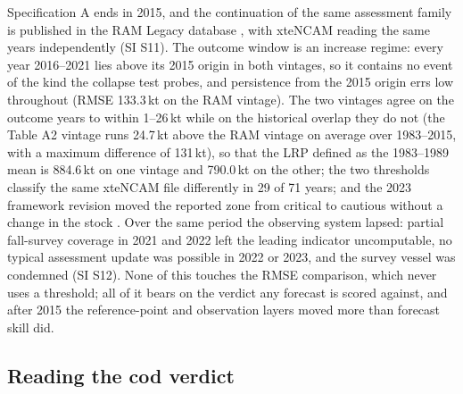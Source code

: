 \documentclass[preprint,11pt,authoryear]{elsarticle}
\theoremstyle{definition}
\theoremstyle{remark}
\begin{document}
Specification A ends in 2015, and the continuation of the same assessment family is published in the RAM Legacy database \citep[v4.66, stock COD2J3KL;][]{Ricard2012}, with xteNCAM reading the same years independently (SI S11). The outcome window is an increase regime: every year 2016--2021 lies above its 2015 origin in both vintages, so it contains no event of the kind the collapse test probes, and persistence from the 2015 origin errs low throughout (RMSE 133.3\,kt on the RAM vintage). The two vintages agree on the outcome years to within 1--26\,kt while on the historical overlap they do not (the Table A2 vintage runs 24.7\,kt above the RAM vintage on average over 1983--2015, with a maximum difference of 131\,kt), so that the LRP defined as the 1983--1989 mean is 884.6\,kt on one vintage and 790.0\,kt on the other; the two thresholds classify the same xteNCAM file differently in 29 of 71 years; and the 2023 framework revision moved the reported zone from critical to cautious without a change in the stock \citep{DFO2024a,Regular2025}. Over the same period the observing system lapsed: partial fall-survey coverage in 2021 and 2022 left the leading indicator uncomputable, no typical assessment update was possible in 2022 or 2023, and the survey vessel was condemned (SI S12). None of this touches the RMSE comparison, which never uses a threshold; all of it bears on the verdict any forecast is scored against, and after 2015 the reference-point and observation layers moved more than forecast skill did.

\subsection{Reading the cod verdict}\label{sec:codreading}
\end{document}
